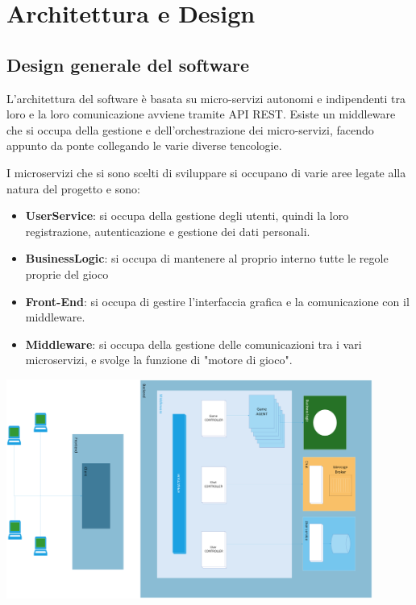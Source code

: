 \chapter{Architettura e Design}
\label{ch:architectures}

\section{Design generale del software}

L'architettura del software è basata su micro-servizi autonomi e indipendenti tra loro e la loro comunicazione avviene tramite API REST.
Esiste un middleware che si occupa della gestione e dell'orchestrazione dei micro-servizi, facendo appunto da ponte collegando le varie diverse tencologie.

I microservizi che si sono scelti di sviluppare si occupano di varie aree legate alla natura del progetto e sono:
\begin{itemize}
    \item \textbf{UserService}: si occupa della gestione degli utenti, quindi la loro registrazione, autenticazione e gestione dei dati personali.
    \item \textbf{BusinessLogic}: si occupa di mantenere al proprio interno tutte le regole proprie del gioco
    \item \textbf{Front-End}: si occupa di gestire l'interfaccia grafica e la comunicazione con il middleware.
    \item \textbf{Middleware}: si occupa della gestione delle comunicazioni tra i vari microservizi, e svolge la funzione di "motore di gioco".
\end{itemize}

\includegraphics[width=12cm]{report/img/Architecture.png}\\[10.5cm]

